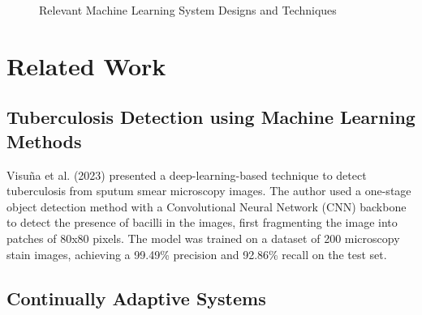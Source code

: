 \documentclass[../main.tex]{subfiles}
\begin{document}
    \newpage

    \begin{figure}
        \centering
        \caption{Relevant Machine Learning System Designs and Techniques}
        \resizebox*{1.1\columnwidth}{!}{
            \hspace*{-3cm}
            
        }
        \label{fig:supervised_learning}
    \end{figure}
    \clearpage
    
    
	
    

    \section{Related Work} \label{related_work}

    \subsection{Tuberculosis Detection using Machine Learning Methods} \label{sec:ml_tuberculosis_detection}

    Visuña et al. (2023) \cite{visuna_novel_2023} presented a deep-learning-based technique to detect tuberculosis from sputum smear microscopy images. The author used a one-stage object detection method with a Convolutional Neural Network (CNN) backbone to detect the presence of bacilli in the images, first fragmenting the image into patches of 80x80 pixels. The model was trained on a dataset of 200 microscopy stain images, achieving a 99.49\% precision and 92.86\% recall on the test set. 
    
    \subsection{Continually Adaptive Systems} \label{sec:continually_adaptive_systems}
\end{document}
